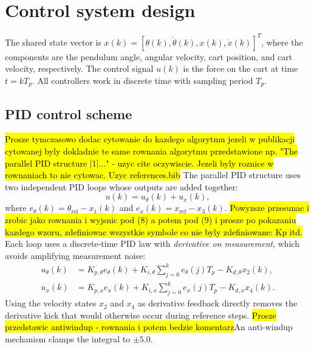 \documentclass[twocolumn]{svjour3}
\begin{document}
    \section{Control system design}
	\label{sec:r}
    The shared state vector is
$x(k)=[\theta(k),\dot{\theta}(k),x(k),\dot{x}(k)]^T$, where the components are the pendulum
angle, angular velocity, cart position, and cart velocity, respectively. The control signal
$u(k)$ is the force on the cart at time $t = kT_p$.
All controllers work in discrete time with sampling period $T_p$. 

\subsection{PID control scheme}
\hl{Prosze tymczasowo dodac cytowanie do kazdego algorytmu jezeli w publikacji cytowanej byly dokladnie te same rownania algorytmu przedstawione np. "The parallel PID structure [1]..." - uzyc cite oczywiscie. Jezeli byly roznice w rownaniach to nie cytowac. Uzyc references.bib}
The parallel PID structure uses two independent PID loops whose outputs are added together:
\begin{equation}
u(k) = u_{\theta}(k) + u_{x}(k),
\end{equation}
where $e_{\theta}(k)=\theta_\mathrm{ref}-x_1(k)$ and $e_x(k)=x_\mathrm{ref}-x_3(k)$.
\hl{Powyzsze przesunac i zrobic jako rownania i wyjsnic pod (8) a potem pod (9) i prosze po pokazaniu kazdego wzoru, zdefiniowac wszystkie symbole co nie byly zdefiniowane: Kp itd.}
Each loop uses a discrete-time PID law with \emph{derivative on measurement}, which avoids
amplifying measurement noise:
\begin{align}
u_{\theta}(k) &= K_{p,\theta}e_{\theta}(k) + K_{i,\theta}\!\sum_{j=0}^{k}\!e_{\theta}(j)T_p
               - K_{d,\theta}x_2(k),\label{eq:pid_theta}\\
u_{x}(k) &= K_{p,x}e_x(k) + K_{i,x}\!\sum_{j=0}^{k}\!e_x(j)T_p
           - K_{d,x}x_4(k).\label{eq:pid_x}
\end{align}
Using the velocity states $x_2$ and $x_4$ as derivative feedback directly removes the
derivative kick that would otherwise occur during reference steps. \hl{Prosze przedstawic antiwindup - rownania i potem bedzie komentarz}An anti-windup mechanism
clamps the integral to $\pm 5.0$.
\end{document}
